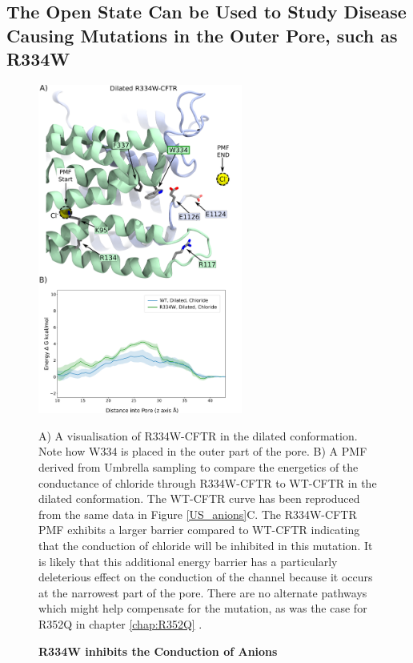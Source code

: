 \subsection{The Open State Can be Used to Study Disease Causing Mutations in the Outer Pore, such as R334W}


\begin{figure}
	\label{R334_pmf}
	\begin{center}
		\includegraphics[width=0.6\textwidth]{figures/opening/R334W_pmf_combined.pdf}
	\end{center}
	\captionsetup{singlelinecheck = false, justification=raggedright}
	\caption[R334W Inhibits the Conduction of Anions] {\textbf{R334W inhibits the Conduction of Anions}}{A) A visualisation of R334W-CFTR in the dilated conformation. Note how W334 is placed in the outer part of the pore. B) A PMF derived from Umbrella sampling to compare the energetics of the conductance of chloride through R334W-CFTR to WT-CFTR in the dilated conformation. The WT-CFTR curve has been reproduced from the same data in Figure \ref{US_anions}C. The R334W-CFTR PMF exhibits a larger barrier compared to WT-CFTR indicating that the conduction of chloride will be inhibited in this mutation. It is likely that this additional energy barrier has a particularly deleterious effect on the conduction of the channel because it occurs at the narrowest part of the pore. There are no alternate pathways which might help compensate for the mutation, as was the case for R352Q in chapter \ref{chap:R352Q} \cite{wong2022a}.  }
\end{figure}

